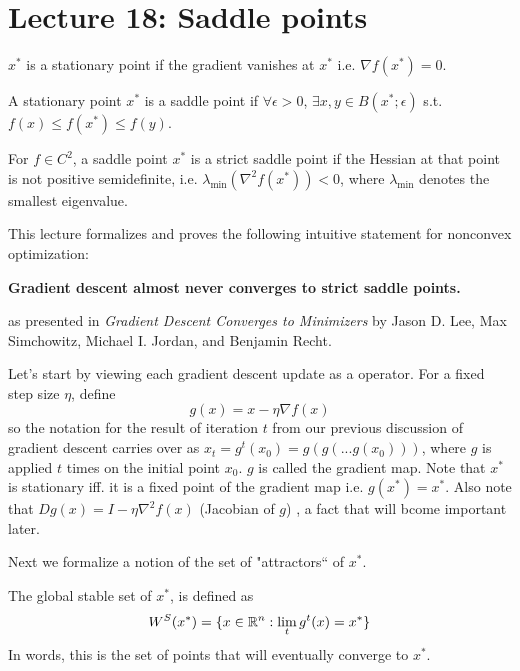 \section{Lecture 18: Saddle points} 

\begin{definition}
$x^*$ is a stationary point if the gradient vanishes at $x^*$ i.e. $\nabla f(x^*) = 0$. 
\end{definition}

\begin{definition}
A stationary point $x^*$ is a saddle point if $\forall \epsilon>0$,  $\exists x,y \in B(x^*;\epsilon)$ s.t. \\
$f(x)\leq f(x^*)\leq f(y)$.
\end{definition}

\begin{definition}
For $f\in C^2$, a saddle point $x^*$ is a strict saddle point if the Hessian at that point is not positive semidefinite, i.e.
$\lambda_{\text{min}}(\nabla^2 f(x^*)) < 0$,
where $\lambda_{\text{min}}$ denotes the smallest eigenvalue.
\end{definition}

\noindent
This lecture formalizes and proves the following intuitive statement for nonconvex optimization:
\begin{center}
\textbf{Gradient descent almost never converges to strict saddle points.}
\end{center}
as presented in \textit{Gradient Descent Converges to Minimizers} by Jason D. Lee, Max Simchowitz, Michael I. Jordan, and Benjamin Recht.

\noindent
Let's start by viewing each gradient descent update as a operator.  
For a fixed step size $\eta$, define
$$
g(x) = x-\eta\nabla f(x)
$$ 
so the notation for the result of iteration $t$ from our previous discussion of gradient descent carries over as $x_t = g^t(x_0) = g(g(...g(x_0)))$, where $g$ is applied $t$ times on the initial point $x_0$. $g$ is called the gradient map. Note that $x^*$ is stationary iff. it is a fixed point of the gradient map i.e. $g(x^*) = x^*$. Also note that
$D g(x) = I - \eta\nabla^2 f(x)$ (Jacobian of $g$) , a fact that will bcome important later.

\noindent
Next we formalize a notion of the set of "attractors`` of $x^*$.
\begin{definition}
The global stable set of $x^*$, is defined as
$$
W^S(x^*) = \{ x\in\mathbb{R}^n: \lim_{t} g^t(x) = x^* \}
$$
In words, this is the set of points that will eventually converge to $x^*$.
\end{definition}

